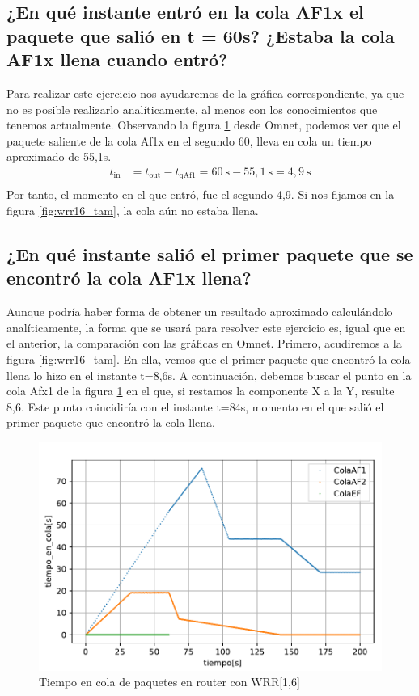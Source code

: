 \vspace{0,3cm}

\subsection{¿En qué instante entró en la cola AF1x el paquete que salió en t = 60s? ¿Estaba la cola AF1x llena cuando
entró?}
Para realizar este ejercicio nos ayudaremos de la gráfica correspondiente, ya que no es posible 
realizarlo analíticamente, al menos con los conocimientos que tenemos actualmente. Observando 
la figura \ref{fig:wrr16_time} desde Omnet, podemos ver que el paquete saliente de la cola Af1x en el segundo 60, lleva 
en cola un tiempo aproximado de 55,1s.
\[
    \begin{aligned}
        t_{\text{in}} &= t_{\text{out}} - t_{\text{qAf1}} = 60~\text{s} - 55,1~\text{s}= 4,9~\text{s} \\
    \end{aligned}
\]
Por tanto, el momento en el que entró, fue el segundo 4,9. Si nos fijamos en la figura \ref{fig:wrr16_tam}, la cola aún no estaba llena.

\vspace{0,3cm}

\subsection{¿En qué instante salió el primer paquete que se encontró la cola AF1x llena?}
Aunque podría haber forma de obtener un resultado aproximado calculándolo analíticamente, la forma
que se usará para resolver este ejercicio es, igual que en el anterior, la comparación con las gráficas en Omnet.
Primero, acudiremos a la figura \ref{fig:wrr16_tam}. En ella, vemos que el primer paquete que encontró la cola llena
lo hizo en el instante t=8,6s. 
A continuación, debemos buscar el punto en la cola Afx1 de la figura \ref{fig:wrr16_time} en el que,
si  restamos la componente X a la Y, resulte 8,6. Este punto coincidiría con el instante t=84s, momento
en el que salió el primer paquete que encontró la cola llena.

\begin{figure}[!ht]
    \centering
    \includegraphics{graficas/WRR/tiempo_en_cola_wrr.pdf}
    \caption{Tiempo en cola de paquetes en router con WRR[1,6]}
    \label{fig:wrr16_time}
\end{figure}


